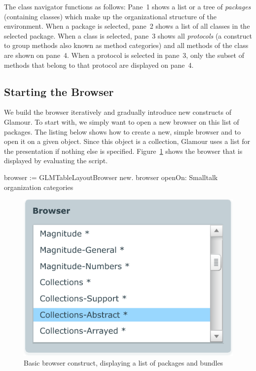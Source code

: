 \documentclass[a4paper,10pt,twoside]{book}
\begin{document}
The class navigator functions as follows: Pane~1 shows a list or a
tree of \emph{packages} (containing classes) which make up the
organizational structure of the environment. When a package is
selected, pane~2 shows a list of all classes in the selected
package. When a class is selected, pane~3 shows all \emph{protocols}
(a construct to group methods also known as method categories) and all
methods of the class are shown on pane~4. When a protocol is
selected in pane~3, only the subset of methods that belong to that
protocol are displayed on pane~4.


\subsection{Starting the Browser}

We build the browser iteratively and gradually introduce new
constructs of Glamour. To start with, we simply want to open a new
browser on this list of packages. The listing below shows how to
create a new, simple browser and to open it on a given object. Since
this object is a collection, Glamour uses a list for the presentation
if nothing else is specified. Figure~\ref{fig:helloworld} shows the
browser that is displayed by evaluating the script.

\begin{code}{}
browser := GLMTableLayoutBrowser new.
browser openOn: Smalltalk organization  categories
\end{code}

\begin{figure}[htbp]
\centerline{\includegraphics[width=\linewidth]{helloworld.pdf}}
\caption{Basic browser construct, displaying a list of packages and bundles}
\label{fig:helloworld}
\end{figure}
\end{document}
